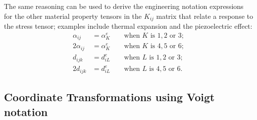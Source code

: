 The same reasoning can be used to derive the engineering notation expressions for the other material property tensors in the $K_{ij}$ matrix that relate a response to the stress tensor; examples include thermal expansion and the piezoelectric effect:
\begin{subequations}\begin{align}
	\alpha_{ij} &= \alpha^e_K \qquad\mbox{when $K$ is $1,2$ or $3$};\\
	2\alpha_{ij} &= \alpha^e_K \qquad\mbox{when $K$ is $4,5$ or $6$};\\
	d_{ijk} &= d^e_{iL} \qquad\mbox{when $L$ is $1,2$ or $3$};\\
	2d_{ijk} &= d^e_{iL}\qquad\mbox{when $L$ is $4,5$ or $6$}.
\end{align}\end{subequations}


\subsection{Coordinate Transformations using Voigt notation}\label{\chabbr:sec:Voigttrafos}

